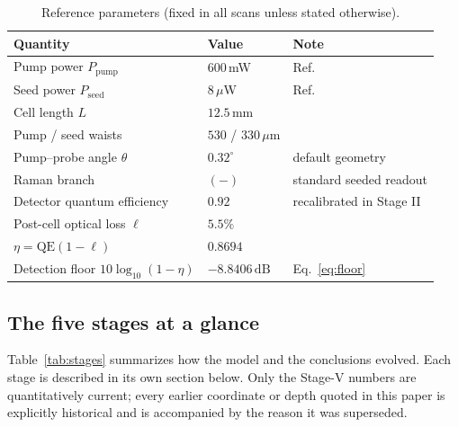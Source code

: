 \documentclass[11pt,a4paper]{article}
\newcommand{\dB}{\,\mathrm{dB}}
\begin{document}
\begin{table}[ht]
\centering
\caption{Reference parameters (fixed in all scans unless stated otherwise).}
\label{tab:ref}
\begin{tabular}{lll}
\toprule
Quantity & Value & Note\\
\midrule
Pump power $P_{\mathrm{pump}}$ & $600$\,mW & Ref.~\cite{Sim2025}\\
Seed power $P_{\mathrm{seed}}$ & $8\,\mu$W & Ref.~\cite{Sim2025}\\
Cell length $L$ & $12.5$\,mm & \\
Pump / seed waists & $530$ / $330\,\mu$m & \\
Pump--probe angle $\theta$ & $0.32^{\circ}$ & default geometry\\
Raman branch & $(-)$ & standard seeded readout\\
Detector quantum efficiency & $0.92$ & recalibrated in Stage II\\
Post-cell optical loss $\ell$ & $5.5\%$ & \\
\midrule
$\eta=\mathrm{QE}(1-\ell)$ & $0.8694$ & \\
Detection floor $10\log_{10}(1-\eta)$ & $-8.8406\dB$ & Eq.~\eqref{eq:floor}\\
\bottomrule
\end{tabular}
\end{table}

\subsection{The five stages at a glance}
Table~\ref{tab:stages} summarizes how the model and the conclusions evolved.
Each stage is described in its own section below. Only the Stage-V numbers
are quantitatively current; every earlier coordinate or depth quoted in this
paper is explicitly historical and is accompanied by the reason it was
superseded.
\end{document}
